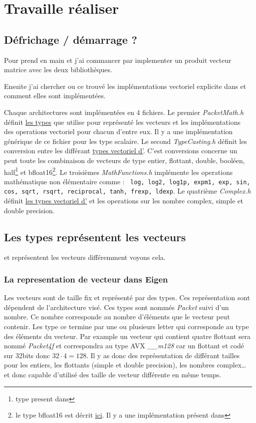 \section{Travaille réaliser}

\subsection{Défrichage / démarrage ?}

Pour prend en main \Eigen et \MIPP j'ai commancer par implementer un produit
vecteur matrice avec les deux bibliothèques.

Ensuite j'ai chercher ou ce trouvé les implémentations vectoriel explicite dans \Eigen
et comment elles sont implémentées.

Chaque architectures sont implémentées en 4 fichiers. Le premier \emph{PacketMath.h}
définit \hyperref[typeEigen]{les types} que \Eigen utilise pour représenté les
vecteurs et les implémentations des operations vectoriel pour chacun d'entre eux.
Il y a une implémentation générique de ce fichier pour les type scalaire. Le second
\emph{TypeCasting.h} définit les conversion entre les différant \hyperref[typeEigen]{types
vectoriel d'\Eigen}. C'est conversions concerne un peut toute les combinaison
de vecteurs de type entier, flottant, double, booléen, half\footnote{type present dans
\Eigen} et bfloat16\footnote{le type bfloat16 est décrit
\href{https://en.wikipedia.org/wiki/Bfloat16_floating-point_format}{ici}. Il y a une
implémentation présent dans \Eigen}. Le troisièmes \emph{MathFunctions.h}
implémente les operations mathématique non élémentaire comme : \texttt{ log, log2, log1p,
expm1, exp, sin, cos, sqrt, rsqrt, reciprocal, tanh, frexp, ldexp}. Le quatrième
\emph{Complex.h} définit \hyperref[typeEigen]{les types vectoriel d'\Eigen} et
les operations sur les nombre complex, simple et double precision.

\subsection{Les types représentent les vecteurs}
\Eigen et \MIPP représentent les vecteurs différemment voyons cela.

\label{typeEigen}
\subsubsection{La representation de vecteur dans Eigen}
{
  Les vecteurs sont de taille fix et représenté par des types. Ces représentation sont
  dépendent de l'architecture visé. Ces types sont nommés \emph{Packet} suivi d'un nombre.
  Ce nombre corresponde au nombre d'éléments que le vecteur peut contenir. Les type ce
  termine par une ou plusieurs letter qui corresponde au type des éléments du vecteur.
  Par example un vecteur qui contient quatre flottant sera nommé \emph{Packet4f} et
  correspondra au type AVX \emph{__m128} car un flottant et codé sur 32bits donc
  $32\cdot 4=128$. Il y as donc des représentation de différant tailles pour les entiers,
  les flottants (simple et double precision), les nombres complex\dots
  \Eigen et donc capable d'utilisé des taille de vecteur différente en même temps.
}

